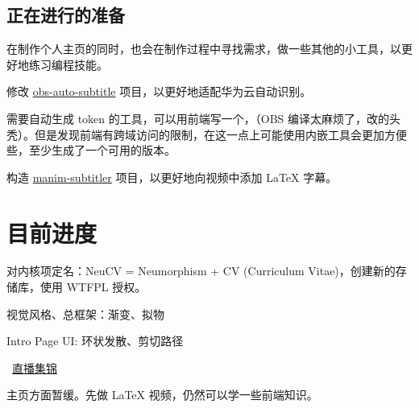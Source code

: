 \documentclass[UTF8]{ctexart}
\begin{document}
\subsection*{正在进行的准备}

    在制作个人主页的同时，也会在制作过程中寻找需求，做一些其他的小工具，以更好地练习编程技能。

    修改 \href{https://gitee.com/LogCreative/obs-auto-subtitle}{obs-auto-subtitle} 项目，以更好地适配华为云自动识别。

    需要自动生成 token 的工具，可以用前端写一个，（OBS 编译太麻烦了，改的头秃）。但是发现前端有跨域访问的限制，在这一点上可能使用内嵌工具会更加方便些，至少生成了一个可用的版本。

    \noindent{}

    构造 \href{https://github.com/LogCreative/manim-subtitler}{manim-subtitler} 项目，以更好地向视频中添加 \LaTeX{} 字幕。

\section{目前进度}

    对内核项定名：NeuCV = Neumorphism + CV (Curriculum Vitae)，创建新的存储库，使用 WTFPL 授权。

    视觉风格、总框架：渐变、拟物

    Intro Page UI: 环状发散、剪切路径

    \faYoutubePlay~\href{https://www.bilibili.com/video/BV1Lh411z7tZ/}{直播集锦}

    主页方面暂缓。先做 \LaTeX{} 视频，仍然可以学一些前端知识。
\end{document}
